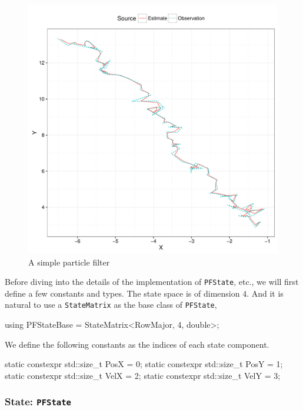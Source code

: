 \begin{figure}
  \includegraphics[width=\linewidth]{cpp/pf}
  \caption{A simple particle filter}
  \label{fig:pf}
\end{figure}

Before diving into the details of the implementation of \verb|PFState|, etc.,
we will first define a few constants and types. The state space is of dimension
$4$. And it is natural to use a \verb|StateMatrix| as the base class of
\verb|PFState|,
\begin{cppcode}
  using PFStateBase = StateMatrix<RowMajor, 4, double>;
\end{cppcode}
We define the following constants as the indices of each state component.
\begin{cppcode}
  static constexpr std::size_t PosX = 0;
  static constexpr std::size_t PosY = 1;
  static constexpr std::size_t VelX = 2;
  static constexpr std::size_t VelY = 3;
\end{cppcode}

\subsubsection{State: \texttt{PFState}}

